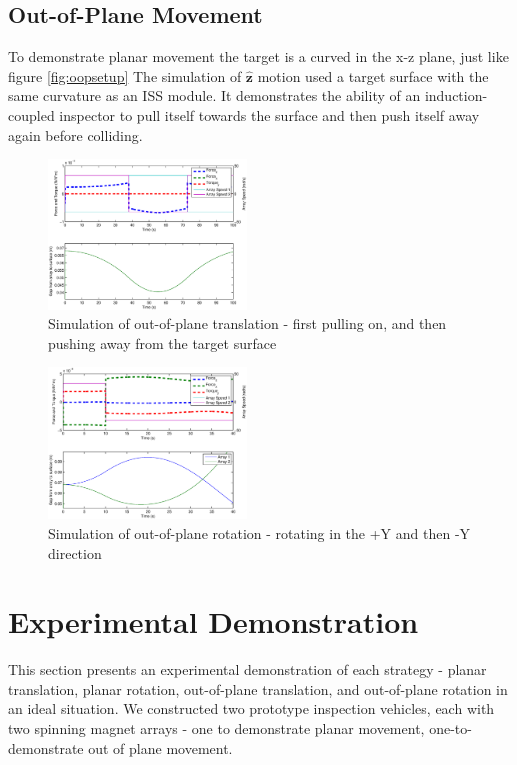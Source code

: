 \documentclass[letterpaper, 10 pt, conference]{ieeeconf}  %
\begin{document}
\subsection{Out-of-Plane Movement}\label{sec:oop_movement_sim}
To demonstrate planar movement the target is a curved in the x-z plane, just like figure \ref{fig:oopsetup} 
The simulation of $\hat{\textbf{z}}$ motion used a target surface with the same curvature as an ISS module. It demonstrates the ability of an induction-coupled inspector to pull itself towards the surface and then push itself away again before colliding. 
     \begin{figure}[thpb]
      \centering
      \includegraphics[width = 0.47\textwidth]{figures/curve_translations.eps}
      \caption{Simulation of out-of-plane translation - first pulling on, and then pushing away from the target surface}
      \label{fig:oop_translation_sim}
   \end{figure}
   
   \begin{figure}[thpb]
      \centering
      \includegraphics[width = 0.47\textwidth]{figures/curve_rotations.eps}
      \caption{Simulation of out-of-plane rotation - rotating in the +Y and then -Y direction}
      \label{fig:oop_rotation_sim}
   \end{figure}

\section{Experimental Demonstration}\label{sec:experiments}
This section presents an experimental demonstration of each strategy - planar translation, planar rotation, out-of-plane translation, and out-of-plane rotation in an ideal situation. We constructed two prototype inspection vehicles, each with two spinning magnet arrays - one to demonstrate planar movement, one-to-demonstrate out of plane movement. 
\end{document}
